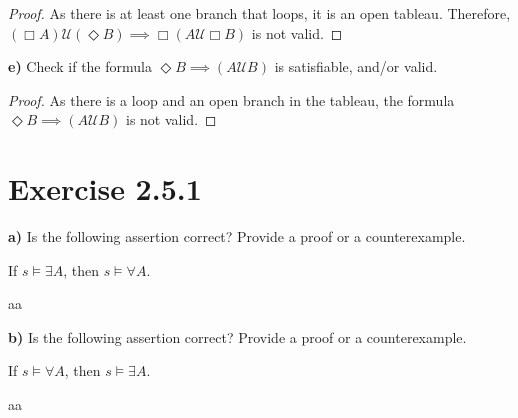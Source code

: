 \documentclass[titlepage, letterpaper, fleqn]{article}
\newcommand{\spacepls}{\vspace{5mm}}
\newcommand{\until}{\mathscr{U}}
\begin{document}
\begin{proof}
As there is at least one branch that loops, it is an open tableau. Therefore, \((\Box A)\until(\Diamond B) \implies \Box(A \until \Box B)\)
is not valid.
\end{proof}

\pagebreak

{\large \textbf{e)} Check if the formula \(\Diamond B \implies (A \until B)\) is satisfiable, and/or valid.}

\spacepls


\begin{proof}
As there is a loop and an open branch in the tableau, the formula \(\Diamond B \implies (A \until B)\) is not valid.
\end{proof}

\section{Exercise 2.5.1}

{\large \textbf{a)} Is the following assertion correct? Provide a proof or a counterexample.

If \(s \models \exists A\), then \(s \models \forall A\).}

aa

{\large \textbf{b)} Is the following assertion correct? Provide a proof or a counterexample.

If \(s \models \forall A\), then \(s \models \exists A\).}

aa
\end{document}
